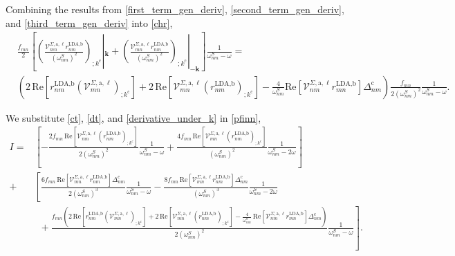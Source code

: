 Combining the results from \eqref{first_term_gen_deriv},
\eqref{second_term_gen_deriv}, and \eqref{third_term_gen_deriv}
into \eqref{chr},
\begin{align}\label{derivative_under_k}
&   \frac{f_{mn}}{2}\left[\left(\frac{\mathcal{V}^{\Sigma,\text{a},\ell}_{mn}
    r^{\text{LDA,b}}_{nm}}{(\omega^S_{nm})^2}\right)
    _{;k^{\text{c}}}|_{\mathbf{k}} 
+   \left(\frac{\mathcal{V}^{\Sigma,\text{a},\ell}_{mn}
    r^{\text{LDA,b}}_{nm}}{(\omega^S_{nm})^2}\right)
    _{;k^{\text{c}}}|_{-\mathbf{k}}\right]\frac{1}{\omega^S_{nm}-\omega}
=   \nonumber\\
&   \left(2\,\mathrm{Re}\left[r^{\text{LDA,b}}_{nm}
    \left(\mathcal{V}^{\Sigma,\text{a},\ell}_{mn}\right)_{;k^{\text{c}}}\right]
+   2\,\mathrm{Re}\left[\mathcal{V}^{\Sigma,\text{a},\ell}_{mn}
    \left(r^{\text{LDA,b}}_{nm}\right)_{;k^{\text{c}}}\right] 
-   \frac{4}{\omega^{S}_{nm}}\mathrm{Re}
    \left[\mathcal{V}^{\Sigma,\text{a},\ell}_{nm}r^{\text{LDA,b}}_{mn}\right]
    \Delta_{nm}^{\text{c}}\right)\frac{f_{mn}}{2(\omega^{S}_{nm})^{2}}
    \frac{1}{\omega^S_{nm}-\omega}
.
\end{align}

We substitute \eqref{ct}, \eqref{dt}, and \eqref{derivative_under_k} in 
\eqref{pfinn},
\begin{align*}
I
=   &\left[-\frac{2f_{mn}\,\mathrm{Re}
    \left[\mathcal{V}^{\Sigma,\text{a},\ell}_{mn}
    \left(r^{\text{LDA,b}}_{nm}\right)_{;k^{\text{c}}}\right]}
    {2(\omega^{S}_{nm})^{2}}\frac{1}{\omega^{S}_{nm}-\omega} 
+   \frac{4f_{mn}\,\mathrm{Re}\left[\mathcal{V}^{\Sigma,\text{a},\ell}_{mn}
    \left(r^{\text{LDA,b}}_{nm}\right)_{;k^{\text{c}}}\right]}
    {(\omega^{S}_{nm})^{2}}\frac{1}{\omega^{S}_{nm}-2\omega}\right]\nonumber\\
+   &\left[\frac{6f_{mn}\,\mathrm{Re}
    \left[\mathcal{V}^{\Sigma,\text{a},\ell}_{mn}r^{\text{LDA,b}}_{nm}\right]
    \Delta^{\text{c}}_{nm}}{2(\omega^{S}_{nm})^{3}}
    \frac{1}{\omega^{S}_{nm}-\omega} 
-   \frac{8f_{mn}\,\mathrm{Re}
    \left[\mathcal{V}^{\Sigma,\text{a},\ell}_{mn}r^{\text{LDA,b}}_{nm}\right]
    \Delta^{\text{c}}_{nm}}{(\omega^{S}_{nm})^{3}}
    \frac{1}{\omega^{S}_{nm}-2\omega}\right.\nonumber\\
&\,\,\,+ 
    \left.\frac{f_{mn}\left(2\,\mathrm{Re}\left[r^{\text{LDA,b}}_{nm}
    \left(\mathcal{V}^{\Sigma,\text{a},\ell}_{mn}\right)_{;k^{\text{c}}}\right]
+   2\,\mathrm{Re}\left[\mathcal{V}^{\Sigma,\text{a},\ell}_{mn}
    \left(r^{\text{LDA,b}}_{nm}\right)_{;k^{\text{c}}}\right] 
-   \frac{4}{\omega^{S}_{nm}}\,\mathrm{Re}
    \left[\mathcal{V}^{\Sigma,\text{a},\ell}_{nm}r^{\text{LDA,b}}_{mn}\right]
    \Delta_{nm}^{\text{c}}\right)}{2(\omega^{S}_{nm})^{2}}
    \frac{1}{\omega^S_{nm}-\omega}\right]
.
\end{align*}

